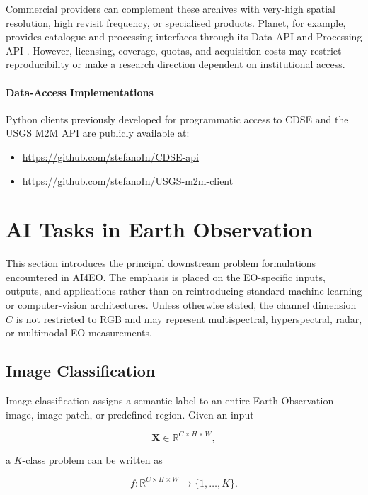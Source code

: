 \documentclass[11pt,a4paper]{article}
\begin{document}
Commercial providers can complement these archives with very-high
spatial resolution, high revisit frequency, or specialised products.
Planet, for example, provides catalogue and processing interfaces through
its Data API and Processing API
\cite{planet_data_api,planet_processing_api}. However, licensing,
coverage, quotas, and acquisition costs may restrict reproducibility or
make a research direction dependent on institutional access.

\paragraph{Data-Access Implementations}

Python clients previously developed for programmatic access to CDSE and
the USGS M2M API are publicly available at:

\begin{itemize}
    \item \url{https://github.com/stefanoIn/CDSE-api}
    \item \url{https://github.com/stefanoIn/USGS-m2m-client}
\end{itemize}

\section{AI Tasks in Earth Observation}

This section introduces the principal downstream problem formulations
encountered in AI4EO. The emphasis is placed on the EO-specific inputs,
outputs, and applications rather than on reintroducing standard
machine-learning or computer-vision architectures. Unless otherwise
stated, the channel dimension \(C\) is not restricted to RGB and may
represent multispectral, hyperspectral, radar, or multimodal EO
measurements.

\subsection{Image Classification}

Image classification assigns a semantic label to an entire Earth
Observation image, image patch, or predefined region. Given an input

\[
\mathbf{X}\in\mathbb{R}^{C\times H\times W},
\]

a \(K\)-class problem can be written as

\[
f:
\mathbb{R}^{C\times H\times W}
\rightarrow
\{1,\ldots,K\}.
\]
\end{document}
